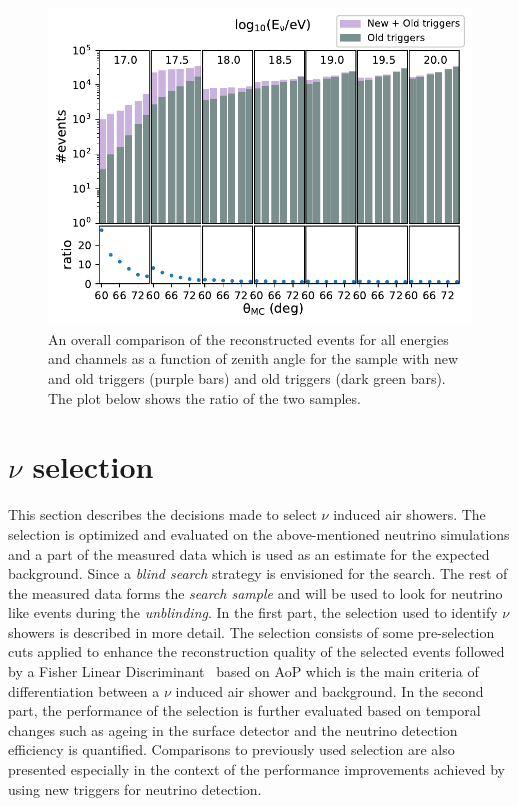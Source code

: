 \begin{figure}[h!]
  \centering
  \includegraphics[width=14.5cm]{thesis_figures/Nu_analysis/MC_control/Events_vs_angle_summary_new.pdf}
  \caption{An overall comparison of the reconstructed events for all energies and channels as a function of zenith angle for the sample with new and old triggers (purple bars) and old triggers (dark green bars). The plot below shows the ratio of the two samples.}
  \label{fig:Events_vs_angle_summary}
\end{figure}


\section{\texorpdfstring{$\nu$}{} selection}
\label{sec:nu_sel}
This section describes the decisions made to select $\nu$ induced air showers. The selection is optimized and evaluated on the above-mentioned neutrino simulations and a part of the measured data which is used as an estimate for the expected background. Since a \textit{blind search} strategy is envisioned for the search. The rest of the measured data forms the \textit{search sample} and will be used to look for neutrino like events during the \textit{unblinding}. 
In the first part, the selection used to identify $\nu$ showers is described in more detail. The selection consists of some pre-selection cuts applied to enhance the reconstruction quality of the selected events followed by a Fisher Linear Discriminant~\cite{Fisher_illustrative} based on AoP which is the main criteria of differentiation between a $\nu$ induced air shower and background.  
In the second part, the performance of the selection is further evaluated based on temporal changes such as ageing in the surface detector and the neutrino detection efficiency is quantified. Comparisons to previously used selection are also presented especially in the context of the performance improvements achieved by using new triggers for neutrino detection.

